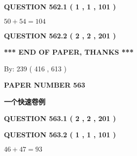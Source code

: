 \documentclass{ctexart}
\begin{document}
{\textbf{\Large{QUESTION
562.1 
 ( 1 , 1 , 101 )
}}}
  
  
 
 

$ %
50 +  %
54=   %
104$
 
 
  
\vspace{0.2in}
  
{\textbf{\Large{QUESTION
562.2 
 ( 2 , 2 , 201 )
}}}
  
  
   
   
 \vspace{0.2in}
 
   
   
   
   
\vspace{1.0in} 
{\textbf{\large{ *** END OF PAPER, THANKS *** }}} 
   
   
\hspace{1.0in} By: 
 239 ( 416 ,  613 )
   
   
   
   
\newpage 
\setcounter{page}{ 
   563001 } 
   
   
   
   
 {\textbf{ \Large{ PAPER NUMBER  563  }}}
   
   
\vspace{0.2in}
   
   
   
   
   
   
 \vspace{0.2in}
{\LARGE {\textbf{ 一个快速卷例}}}
   
   
  
\vspace{0.2in}
  
{\textbf{\Large{QUESTION
563.1 
 ( 2 , 2 , 201 )
}}}
  
  
  
\vspace{0.2in}
  
{\textbf{\Large{QUESTION
563.2 
 ( 1 , 1 , 101 )
}}}
  
  
 
 

$ %
46 +  %
47=   %
93$
 
 
   
   
 \vspace{0.2in}
 
   
   
\end{document}
